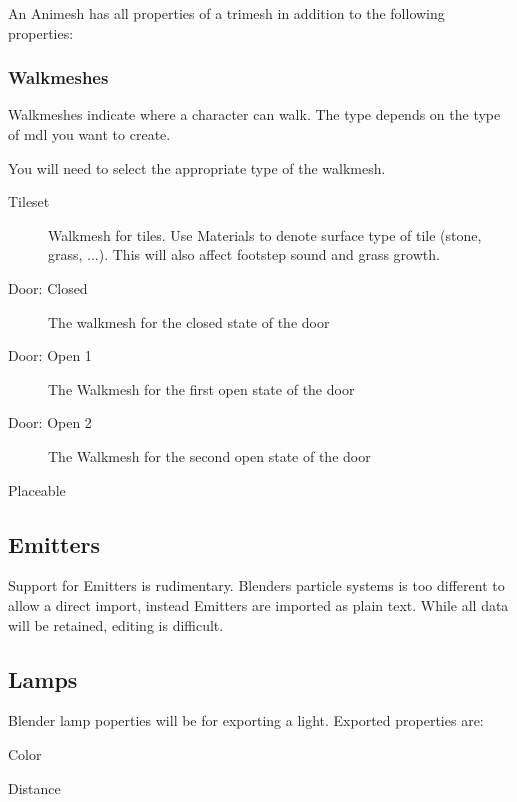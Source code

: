 An Animesh has all properties of a trimesh in addition to the following
properties:

\subsubsection{Walkmeshes}
Walkmeshes indicate where a character can walk. The type depends on the type
of mdl you want to create.

You will need to select the appropriate type of the walkmesh.
\begin{description}
    \item[Tileset] Walkmesh for tiles. Use Materials to denote surface type of
                   tile (stone, grass, ...). This will also affect footstep
                   sound and grass growth.
    \item[Door: Closed] The walkmesh for the closed state of the door
    \item[Door: Open 1] The Walkmesh for the first open state of the door
    \item[Door: Open 2] The Walkmesh for the second open state of the door
    \item[Placeable]
\end{description}

\subsection{Emitters}
Support for Emitters is rudimentary. Blenders particle systems is too
different to allow a direct import, instead Emitters are imported as plain
text. While all data will be retained, editing is difficult.

\subsection{Lamps}
Blender lamp poperties will be for exporting a light.
Exported properties are:
\begin{list}
    \item Color
    \item Distance
\end{list}

